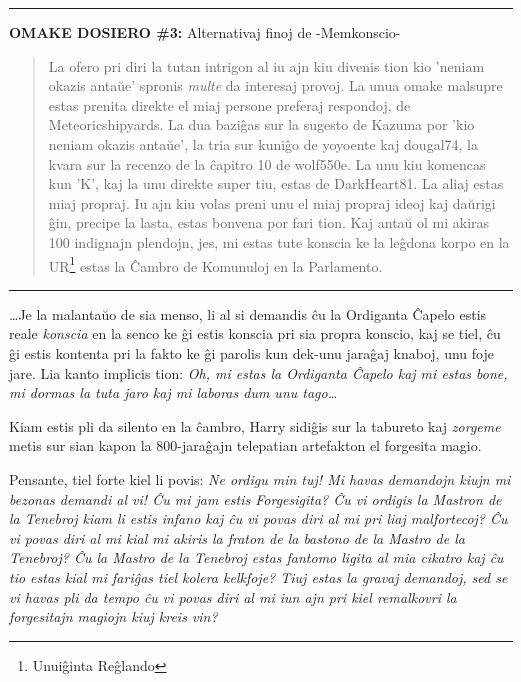\begin{center}\rule{3in}{0.4pt}\end{center}

\textbf{OMAKE DOSIERO \#3:} {\hpfont Alternativaj finoj de -Memkonscio-}

\begin{quote}
  La ofero pri diri la tutan intrigon al iu ajn kiu divenis tion kio
  'neniam okazis antaŭe' spronis \emph{multe} da interesaj provoj. La
  unua omake malsupre estas prenita direkte el miaj persone preferaj
  respondoj, de Meteoricshipyards. La dua baziĝas sur la sugesto de
  Kazuma por 'kio neniam okazis antaŭe', la tria sur kuniĝo de
  yoyoente kaj dougal74, la kvara sur la recenzo de la ĉapitro 10 de
  wolf550e. La unu kiu komencas kun 'K', kaj la unu direkte super tiu,
  estas de DarkHeart81. La aliaj estas miaj propraj. Iu ajn kiu volas
  preni unu el miaj propraj ideoj kaj daŭrigi ĝin, precipe la lasta,
  estas bonvena por fari tion.  Kaj antaŭ ol mi akiras 100 indignajn
  plendojn, jes, mi estas tute konscia ke la leĝdona korpo en la
  UR\footnote{Unuiĝinta Reĝlando} estas la Ĉambro de Komunuloj en la
  Parlamento.
\end{quote}

\begin{center}\rule{3in}{0.4pt}\end{center}

\ldots Je la malantaŭo de sia menso, li al si demandis ĉu la Ordiganta
Ĉapelo estis reale \emph{konscia} en la senco ke ĝi estis konscia pri
sia propra konscio, kaj se tiel, ĉu ĝi estis kontenta pri la fakto ke
ĝi parolis kun dek-unu jaraĝaj knaboj, unu foje jare. Lia kanto
implicis tion: \emph{Oh, mi estas la Ordiganta Ĉapelo kaj mi estas
  bone, mi dormas la tuta jaro kaj mi laboras dum unu tago\ldots}

Kiam estis pli da silento en la ĉambro, Harry sidiĝis sur la tabureto
kaj \emph{zorgeme} metis sur sian kapon la 800-jaraĝajn telepatian
artefakton el forgesita magio.

Pensante, tiel forte kiel li povis: \emph{Ne ordigu min tuj! Mi havas
  demandojn kiujn mi bezonas demandi al vi! Ĉu mi jam estis
  Forgesigita?  Ĉu vi ordigis la Mastron de la Tenebroj kiam li estis
  infano kaj ĉu vi povas diri al mi pri liaj malfortecoj? Ĉu vi povas
  diri al mi kial mi akiris la fraton de la bastono de la Mastro de la
  Tenebroj?  Ĉu la Mastro de la Tenebroj estas fantomo ligita al mia
  cikatro kaj ĉu tio estas kial mi fariĝas tiel kolera kelkfoje? Tiuj
  estas la gravaj demandoj, sed se vi havas pli da tempo ĉu vi povas
  diri al mi iun ajn pri kiel remalkovri la forgesitajn magiojn kiuj
  kreis vin?}

